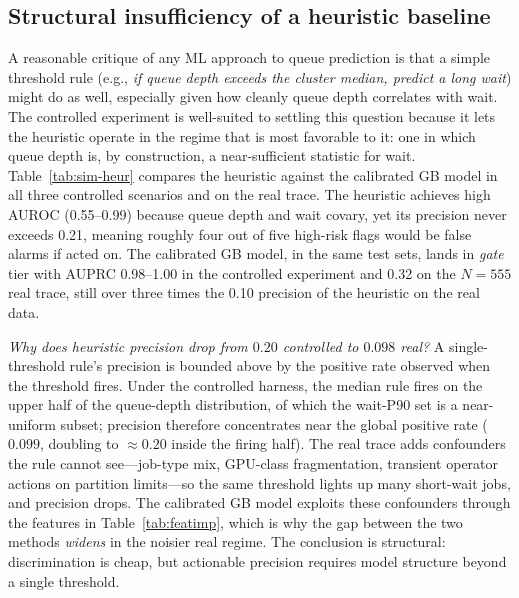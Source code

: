 \documentclass[conference]{IEEEtran}
\begin{document}
\subsection{Structural insufficiency of a heuristic baseline}
A reasonable critique of any ML approach to queue prediction is that a simple threshold rule (e.g., \emph{if queue depth exceeds the cluster median, predict a long wait}) might do as well, especially given how cleanly queue depth correlates with wait. The controlled experiment is well-suited to settling this question because it lets the heuristic operate in the regime that is most favorable to it: one in which queue depth is, by construction, a near-sufficient statistic for wait. Table~\ref{tab:sim-heur} compares the heuristic against the calibrated GB model in all three controlled scenarios and on the real trace. The heuristic achieves high AUROC (0.55--0.99) because queue depth and wait covary, yet its precision never exceeds 0.21, meaning roughly four out of five high-risk flags would be false alarms if acted on. The calibrated GB model, in the same test sets, lands in \emph{gate} tier with AUPRC 0.98--1.00 in the controlled experiment and 0.32 on the $N{=}555$ real trace, still over three times the 0.10 precision of the heuristic on the real data.

\emph{Why does heuristic precision drop from $0.20$ controlled to $0.098$ real?} A single-threshold rule's precision is bounded above by the positive rate observed when the threshold fires. Under the controlled harness, the median rule fires on the upper half of the queue-depth distribution, of which the wait-P90 set is a near-uniform subset; precision therefore concentrates near the global positive rate ($0.099$, doubling to $\approx 0.20$ inside the firing half). The real trace adds confounders the rule cannot see---job-type mix, GPU-class fragmentation, transient operator actions on partition limits---so the same threshold lights up many short-wait jobs, and precision drops. The calibrated GB model exploits these confounders through the features in Table~\ref{tab:featimp}, which is why the gap between the two methods \emph{widens} in the noisier real regime. The conclusion is structural: discrimination is cheap, but actionable precision requires model structure beyond a single threshold.
\end{document}
